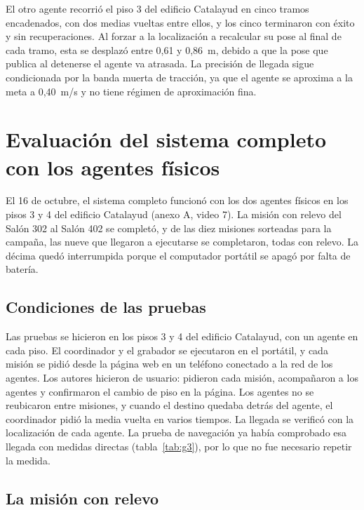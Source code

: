 El otro agente recorrió el piso 3 del edificio Catalayud en cinco tramos encadenados, con dos medias vueltas entre ellos, y los cinco terminaron con éxito y sin recuperaciones. Al forzar a la localización a recalcular su pose al final de cada tramo, esta se desplazó entre 0,61 y 0,86~m, debido a que la pose que publica al detenerse el agente va atrasada. La precisión de llegada sigue condicionada por la banda muerta de tracción, ya que el agente se aproxima a la meta a 0,40~m/s y no tiene régimen de aproximación fina.

\section{Evaluación del sistema completo con los agentes físicos}
\label{sec:res-completo}

El 16 de octubre, el sistema completo funcionó con los dos agentes físicos en los pisos 3 y 4 del edificio Catalayud (anexo A, video 7). La misión con relevo del Salón 302 al Salón 402 se completó, y de las diez misiones sorteadas para la campaña, las nueve que llegaron a ejecutarse se completaron, todas con relevo. La décima quedó interrumpida porque el computador portátil se apagó por falta de batería.

\subsection{Condiciones de las pruebas}

Las pruebas se hicieron en los pisos 3 y 4 del edificio Catalayud, con un agente en cada piso. El coordinador y el grabador se ejecutaron en el portátil, y cada misión se pidió desde la página web en un teléfono conectado a la red de los agentes. Los autores hicieron de usuario: pidieron cada misión, acompañaron a los agentes y confirmaron el cambio de piso en la página. Los agentes no se reubicaron entre misiones, y cuando el destino quedaba detrás del agente, el coordinador pidió la media vuelta en varios tiempos. La llegada se verificó con la localización de cada agente. La prueba de navegación ya había comprobado esa llegada con medidas directas (tabla~\ref{tab:g3}), por lo que no fue necesario repetir la medida.

\subsection{La misión con relevo}


